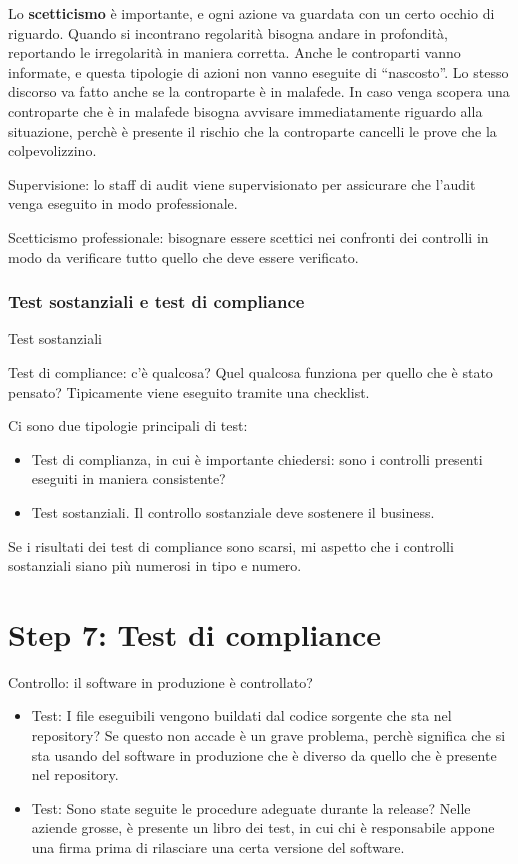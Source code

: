 Lo \textbf{scetticismo} è importante, e ogni azione va guardata con un certo 
occhio di riguardo. Quando si incontrano regolarità bisogna andare in 
profondità, reportando le irregolarità in maniera corretta. Anche le controparti 
vanno informate, e questa tipologie di azioni non vanno eseguite di 
``nascosto''. Lo stesso discorso va fatto anche se la controparte è in malafede.
In caso venga scopera una controparte che è in malafede bisogna avvisare 
immediatamente riguardo alla situazione, perchè è presente il rischio che la 
controparte cancelli le prove che la colpevolizzino.





Supervisione: lo staff di audit viene supervisionato per assicurare che l'audit 
venga eseguito in modo professionale.

Scetticismo professionale: bisognare essere scettici nei confronti dei controlli 
in modo da verificare tutto quello che deve essere verificato.


\subsubsection{Test sostanziali e test di compliance}

Test sostanziali 

Test di compliance: c'è qualcosa? Quel qualcosa funziona per quello che è stato 
pensato? Tipicamente viene eseguito tramite una checklist.

Ci sono due tipologie principali di test:
\begin{itemize}
\item Test di complianza, in cui è importante chiedersi: sono i controlli 
presenti eseguiti in maniera consistente?
\item Test sostanziali. Il controllo sostanziale deve sostenere il business. 
\end{itemize}


Se i risultati dei test di compliance sono scarsi, mi aspetto che i controlli 
sostanziali siano più numerosi in tipo e numero.

\section{Step 7: Test di compliance}

Controllo: il software in produzione è controllato?
\begin{itemize}
\item Test: I file eseguibili vengono buildati dal codice sorgente che sta nel 
repository? Se questo non accade è un grave problema, perchè significa che si 
sta usando del software in produzione che è diverso da quello che è presente nel 
repository.
\item Test: Sono state seguite le procedure adeguate durante la release? Nelle 
aziende grosse, è presente un libro dei test, in cui chi è responsabile appone 
una firma prima di rilasciare una certa versione del software.
\end{itemize}


